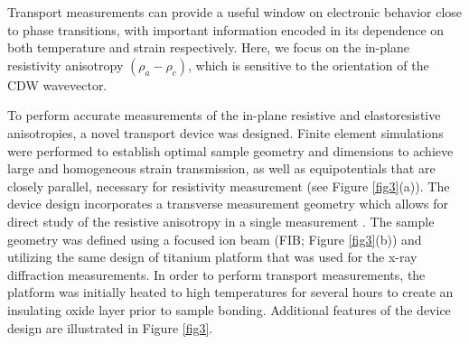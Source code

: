\documentclass[%
 reprint, %
amsmath,amssymb,
aps,
]{revtex4-2}
\begin{document}

Transport measurements can provide a useful window on electronic behavior close to phase transitions, with important information encoded in its dependence on both temperature and strain respectively. Here, we focus on the in-plane resistivity anisotropy $(\rho_a-\rho_c)$, which is sensitive to the orientation of the CDW wavevector.

To perform accurate measurements of the in-plane resistive and elastoresistive anisotropies, a novel transport device was designed. Finite element simulations were performed to establish optimal sample geometry and dimensions to achieve large and homogeneous strain transmission, as well as equipotentials that are closely parallel, necessary for resistivity measurement (see Figure \ref{fig3}(a)). The device design incorporates a transverse measurement geometry which allows for direct study of the resistive anisotropy in a single measurement \cite{Walmsley2017}\cite{Shapiro2016}. The sample geometry was defined using a focused ion beam (FIB; Figure \ref{fig3}(b)) and utilizing the same design of titanium platform that was used for the x-ray diffraction measurements. In order to perform transport measurements, the platform was initially heated to high temperatures for several hours to create an insulating oxide layer prior to sample bonding. Additional features of the device design are illustrated in Figure \ref{fig3}. 
\end{document}
